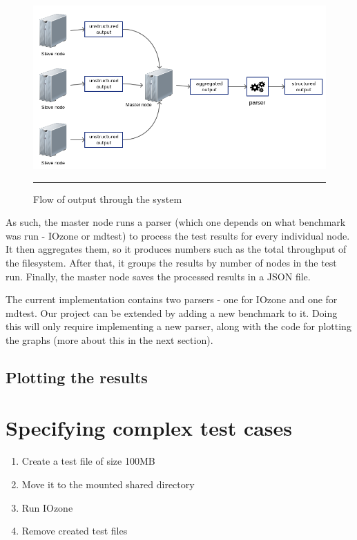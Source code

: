 \begin{figure}[H]
  \centering
    \includegraphics[scale=0.5]{Figures/output_flow.png}
    \rule{25em}{0.5pt}
  \caption[Flow of output through the system]{Flow of output through the system}
  \label{fig:output_flow}
\end{figure}


As such, the master node runs a parser (which one depends on what benchmark was run - IOzone or mdtest) to process the test results for every individual node. It then aggregates them, so it produces numbers such as the total throughput of the filesystem. After that, it groups the results by number of nodes in the test run. Finally, the master node saves the processed results in a JSON file.

The current implementation contains two parsers - one for IOzone and one for mdtest. Our project can be extended by adding a new benchmark to it. Doing this will only require implementing a new parser, along with the code for plotting the graphs (more about this in the next section).


\subsection{Plotting the results}





\section{Specifying complex test cases}


\begin{enumerate}

\item Create a test file of size 100MB
\item Move it to the mounted shared directory
\item Run IOzone
\item Remove created test files

\end{enumerate}


